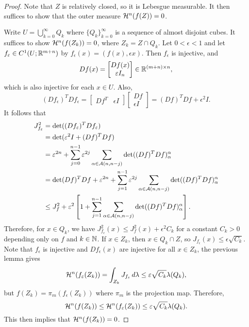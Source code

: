 \documentclass[a4paper]{article}
\renewcommand{\cupinfk}{\bigcup_{k=0}^\infty}
\renewcommand{\seqinfk}[1]{\{ #1 \}_{k=0}^\infty}
\renewcommand{\sumj}{\sum_{j=0}}
\begin{document}
\begin{proof}
Note that $Z$ is relatively closed, so it is Lebesgue
measurable. It then suffices to show that the outer
measure $\mathcal{H}^n (f(Z)) = 0$.

Write $U = \cupinfk Q_k$ where $\seqinfk{Q_k}$ is
a sequence of almost disjoint cubes. It suffices to show
$\mathcal{H}^n (f(Z_k)) = 0$, where $Z_k = Z \cap Q_k$.
Let $0 < \epsilon < 1$ and let $f_\varepsilon \in C^1 (U;
\mathbb{R}^{m+n})$ by $f_\epsilon(x) = (f(x), \epsilon x)$.
Then $f_\epsilon$ is injective, and
\[
Df(x) = \begin{bmatrix}
  Df(x) \\
  \varepsilon I_n
\end{bmatrix}
\in \mathbb{R}^{(m + n) \times n},
\]
which is also injective for each $x \in U$. Also,
\[
(Df_\epsilon)^T Df_\epsilon =
\begin{bmatrix}
  Df^T & \epsilon I
\end{bmatrix}
\begin{bmatrix}
  Df \\
  \epsilon I
\end{bmatrix}
= (Df)^T Df + \epsilon^2 I.
\]
It follows that
\[
\begin{aligned}
  J_{f_\epsilon}^2
  &= \det((Df_\epsilon)^T Df_\epsilon) \\
  &= \det(\epsilon^2 I + (Df)^T Df) \\
  &= \epsilon^{2n} + \sumj^{n-1} \epsilon^{2j}
  \sum_{\alpha \in \acal(n, n - j)} \det((Df)^T Df)_\alpha^\alpha \\
  &= \det (Df)^T Df + \epsilon^{2n}
  + \sum_{j=1}^{n-1} \epsilon^{2j} \sum_{\alpha \in \acal(n, n-j)}
  \det((Df)^T Df)_\alpha^\alpha \\
  &\leq J_f^2 + \epsilon^2 \left[ 1 +
  \sum_{j=1}^{n-1} \sum_{\alpha \in \acal(n, n-j)}
  \det((Df)^T Df)_\alpha^\alpha \right].
\end{aligned}
\]
Therefore, for $x \in Q_k$, we have $J_{f_\epsilon}^2 (x)
\leq J_f^2(x) + \epsilon^2 C_k$ for a constant
$C_k > 0$ depending only on $f$ and $k \in \mathbb{N}$.
If $x \in Z_k$, then $x \in Q_k \cap Z$, so
$J_{f_\epsilon} (x) \leq \epsilon \sqrt{C_k}$.
Note that $f_\epsilon$ is injective and
$Df_\epsilon(x)$ are injective for all $x \in Z_k$,
the previous lemma gives
\[
\mathcal{H}^n (f_\varepsilon(Z_k))
= \int_{Z_k} J_{f_\varepsilon} \, d \lambda
\leq \varepsilon \sqrt{C_k} \lambda(Q_k),
\]
but $f(Z_k) = \pi_{m} (f_\epsilon (Z_k))$ where
$\pi_m$ is the projection map. Therefore,
\[
\mathcal{H}^n (f(Z_k)) \leq \mathcal{H}^n (f_\varepsilon (Z_k))
\leq \varepsilon \sqrt{C_k} \lambda (Q_k).
\]
This then implies that $\mathcal{H}^n(f(Z_k)) = 0$.
\end{proof}
\end{document}
